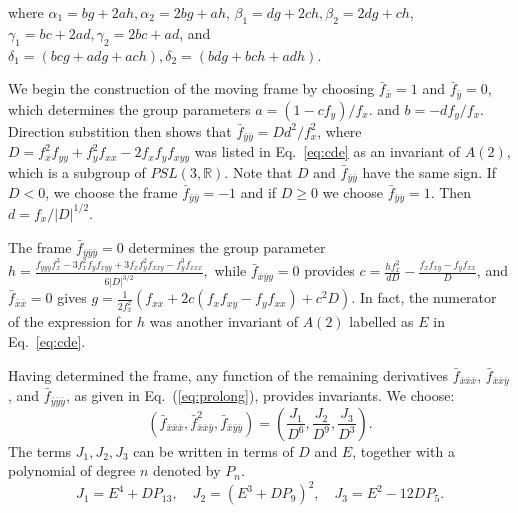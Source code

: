 \documentclass[review,onefignum,onetabnum]{siamonline190516}
\def\R{\mathbb{R}}
\begin{document}
\noindent where $\alpha_1 = b g + 2 a h, \alpha_2 = 2 b g + a h$, $\beta_1 = d g + 2 c h, \beta_2 = 2 d g + c h$, $\gamma_1 = b c + 2 a d, \gamma_2= 2 b c + a d$, and $\delta_1 = (b c g+a d g+a c h), \delta_2 = (b d g+b c h+a d h)$.

We begin the construction of the moving frame by choosing $\bar f_{\bar x}
= 1$ and $\bar f_{\bar y}=  0$, which determines the group parameters $a =
(1-c f_y)/f_x.$ and $b = -d f_y/f_x$. Direction substition then shows that
$\bar f_{\bar y \bar y} = D d^2 / f_x^2$, where $D = f_{x}^2 f_{yy} + f_y^2
f_{xx} - 2 f_x f_y f_{xyy}$ was listed in Eq.~\eqref{eq:cde} as an invariant of
$A(2)$, which is a subgroup of $PSL(3,\R)$. Note that $D$ and
$\bar f_{\bar y \bar y}$ have the same sign. If $D < 0$, we choose the
frame $\bar{f}_{\bar y \bar y} = -1$ and if $D \ge 0$ we choose $\bar
f_{\bar y \bar y} = 1$. Then $d = f_x/|D|^{1/2}.$

The frame $\bar f_{ \bar y \bar y \bar y} = 0$ determines the group
parameter $ h = \frac{f_{yyy}f_x^3 - 3 f_x^2 f_y f_{xyy} + 3 f_x f_y^2
f_{xxy} - f_y^3 f_{xxx}}{6|D|^{3/2}},$ while $\bar f_{ \bar x \bar y 
y}=0$ provides $ c = \frac{h f_x^2}{d D} - \frac{f_x f_{xy} - f_y
f_{xx}}{D}$, and $\bar f_{ \bar x \bar x}=0$ gives $ g = \frac{1}{2
f_x^2}(f_{xx} + 2 c ( f_x f_{xy} - f_y f_{xx} ) + c^2 D).$ In fact, the
numerator of the expression for $h$ was another invariant of $A(2)$ labelled as
$E$ in Eq.~\eqref{eq:cde}.


Having determined the frame, any function of the remaining derivatives $\bar f_{ \bar x \bar x \bar x}$, $\bar f_{ \bar x \bar x \bar y}$, and $\bar f_{ \bar y \bar y \bar y}$, as given in Eq.~(\ref{eq:prolong}), provides invariants. We choose: 
\begin{equation*}
 (\bar f_{\bar x\bar x\bar x}, \bar f_{\bar x\bar x\bar y}^2, \bar f_{\bar
 x\bar y\bar
 y})=\left(\frac{J_1}{D^6},\frac{J_2}{D^9},\frac{J_3}{D^3}\right).
\end{equation*} 
The terms $J_1, J_2, J_3$ can be written in terms of $D$ and $E$, together
with a polynomial of degree $n$ denoted by $P_n$. 
\begin{equation*}
    J_1 = E^4 + D P_{13},\quad J_2 = (E^3 + D P_9)^2,\quad J_3=E^2 -12 D P_5.
\end{equation*}
\end{document}
